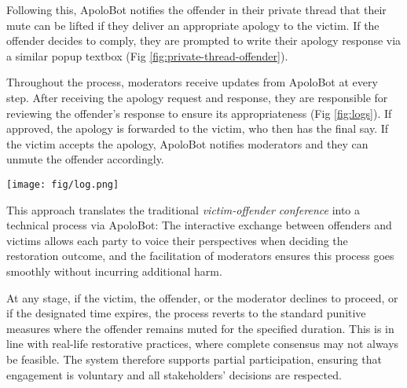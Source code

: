 Following this, ApoloBot notifies the offender in their private thread that their mute can be lifted if they deliver an appropriate apology to the victim. If the offender decides to comply, they are prompted to write their apology response via a similar popup textbox (Fig \ref{fig:private-thread-offender}). 

Throughout the process, moderators receive updates from ApoloBot at every step. After receiving the apology request and response, they are responsible for reviewing the offender’s response to ensure its appropriateness (Fig \ref{fig:logs}). If approved, the apology is forwarded to the victim, who then has the final say. If the victim accepts the apology, ApoloBot notifies moderators and they can unmute the offender accordingly. 

\begin{figure*}[h!]
  \centering
  \texttt{[image: fig/log.png]}
  \caption{Examples of ApoloBot logs received by moderators.}
  \label{fig:logs}
\end{figure*}

This approach translates the traditional \textit{victim-offender conference} into a technical process via ApoloBot: The interactive exchange between offenders and victims allows each party to voice their perspectives when deciding the restoration outcome, and the facilitation of moderators ensures this process goes smoothly without incurring additional harm. 

At any stage, if the victim, the offender, or the moderator declines to proceed, or if the designated time expires, the process reverts to the standard punitive measures where the offender remains muted for the specified duration. This is in line with real-life restorative practices, where complete consensus may not always be feasible. 
The system therefore supports partial participation, ensuring that engagement is voluntary and all stakeholders’ decisions are respected.